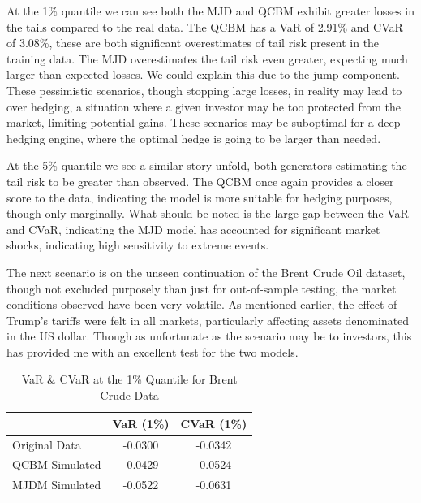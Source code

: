 \documentclass[12pt]{article}
\newcommand{\newp}
    {
    \vskip 0.5cm 
  }
\numberwithin{equation}{section}
\begin{document}
At the 1\% quantile we can see both
the MJD and QCBM exhibit greater losses in the tails compared to the real data.
The QCBM has a VaR of 2.91\% and CVaR of 3.08\%, these are both significant 
overestimates of tail risk present in the training data. The MJD overestimates 
the tail risk even greater, expecting much larger than expected losses. We could 
explain this due to the jump component. These pessimistic scenarios, though 
stopping large losses, in reality may lead to over hedging, a situation where a 
given investor may be too protected from the market, limiting potential gains. These 
scenarios may be suboptimal for a deep hedging engine, where the optimal hedge 
is going to be larger than needed. 
\newp 
At the 5\% quantile we see a similar story unfold, both generators estimating 
the tail risk to be greater than observed. The QCBM once again provides a closer 
score to the data, indicating the model is more suitable for hedging purposes, 
though only marginally. What should be noted is the large gap between the VaR 
and CVaR, indicating the MJD model has accounted for significant market shocks,
indicating high sensitivity to extreme events.\\
\newp 
The next scenario is on the unseen continuation of the Brent Crude Oil dataset,
though not excluded purposely than just for out-of-sample testing, the market 
conditions observed have been very volatile. As mentioned earlier, the effect of 
Trump's tariffs were felt in all markets, particularly affecting assets denominated 
in the US dollar. Though as unfortunate as the scenario may be to investors, this 
has provided me with an excellent test for the two models. 
\begin{table}[h!]
\centering
\begin{tabular}{lcc}
\hline
\textbf{} & \textbf{VaR (1\%)} & \textbf{CVaR (1\%)} \\
\hline
Original Data     & -0.0300 & -0.0342 \\
QCBM Simulated    & -0.0429 & -0.0524 \\
MJDM Simulated    & -0.0522 & -0.0631 \\
\hline
\end{tabular}
\caption{VaR \& CVaR at the 1\% Quantile for Brent Crude Data}
\label{tab:cvar_1_brent}
\end{table}
\end{document}
